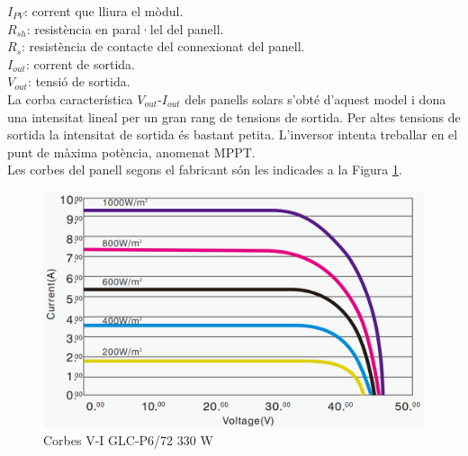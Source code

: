 \noindent $I_{PV}$: corrent que lliura el mòdul.\\
$R_{sh}$: resistència en paral·lel del panell.\\
$R_{s}$: resistència de contacte del connexionat del panell.\\
$I_{out}$: corrent de sortida.\\
$V_{out}$: tensió de sortida.\\
% 
\newline La corba característica $V_{out}$-$I_{out}$ dels panells solars s'obté d'aquest model i dona una intensitat lineal per un gran rang de tensions de sortida. Per altes tensions de sortida la intensitat de sortida és bastant petita. L'inversor intenta treballar en el punt de màxima potència, anomenat MPPT.\\
\newline Les corbes del panell segons el fabricant són les indicades a la Figura \ref{fig:vi}.
\begin{figure}[H]
\begin{center}
\includegraphics[scale=0.3]{images/corba.png}
\end{center}
\caption{Corbes V-I GLC-P6/72 330 W}
\label{fig:vi}
\end{figure}


